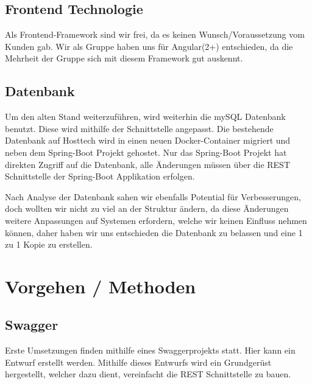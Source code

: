 \documentclass[a4paper]{article}
\begin{document}
	\subsection{Frontend Technologie}
	Als Frontend-Framework sind wir frei, da es keinen Wunsch/Voraussetzung vom Kunden gab.
	Wir als Gruppe haben uns für Angular(2+) entschieden, da die Mehrheit der Gruppe sich mit diesem Framework gut auskennt. 
	
	\subsection{Datenbank}
	Um den alten Stand weiterzuführen, wird weiterhin die mySQL Datenbank benutzt. Diese wird mithilfe der Schnittstelle angepasst.
	Die bestehende Datenbank auf Hosttech wird in einen neuen Docker-Container migriert und neben dem Spring-Boot Projekt gehostet. Nur das Spring-Boot Projekt hat direkten Zugriff auf die Datenbank, alle Änderungen müssen über die REST Schnittstelle der Spring-Boot Applikation erfolgen. 
	
	Nach Analyse der Datenbank sahen wir ebenfalls Potential für Verbesserungen, doch wollten wir nicht zu viel an der Struktur ändern, da diese Änderungen weitere Anpassungen auf Systemen erfordern, welche wir keinen Einfluss nehmen können, daher haben wir uns entschieden die Datenbank zu belassen und eine 1 zu 1 Kopie zu erstellen.
	
	\section{Vorgehen / Methoden}
	
	\subsection{Swagger}
	Erste Umsetzungen finden mithilfe eines Swaggerprojekts statt. Hier kann ein Entwurf erstellt werden. Mithilfe dieses Entwurfs wird ein Grundgerüst hergestellt, welcher dazu dient, vereinfacht die REST Schnittstelle zu bauen.
\end{document}
